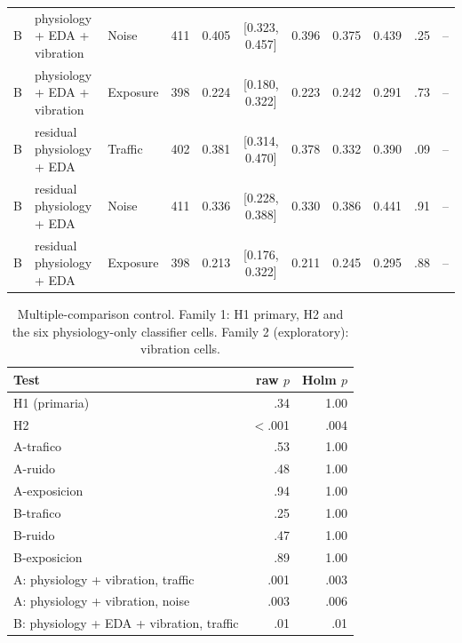 \documentclass[runningheads]{llncs}
\begin{document}
\begin{table}[h]
\begin{tabular}{@{}llllrccccrr@{}}
B & physiology + EDA + vibration & Noise & 411 & 0.405 & [0.323, 0.457] & 0.396 & 0.375 & 0.439 & .25 & --\\
B & physiology + EDA + vibration & Exposure & 398 & 0.224 & [0.180, 0.322] & 0.223 & 0.242 & 0.291 & .73 & --\\
B & residual physiology + EDA & Traffic & 402 & 0.381 & [0.314, 0.470] & 0.378 & 0.332 & 0.390 & .09 & --\\
B & residual physiology + EDA & Noise & 411 & 0.336 & [0.228, 0.388] & 0.330 & 0.386 & 0.441 & .91 & --\\
B & residual physiology + EDA & Exposure & 398 & 0.213 & [0.176, 0.322] & 0.211 & 0.245 & 0.295 & .88 & --\\
\bottomrule
\end{tabular}
\end{table}

\begin{table}[h]
\caption{Multiple-comparison control. Family 1: H1 primary, H2 and the six physiology-only classifier cells. Family 2 (exploratory): vibration cells.}
\small\centering
\begin{tabular}{@{}lrr@{}}
\toprule
Test & raw $p$ & Holm $p$\\
\midrule
H1 (primaria) & .34 & 1.00\\
H2 & $<$.001 & .004\\
A-trafico & .53 & 1.00\\
A-ruido & .48 & 1.00\\
A-exposicion & .94 & 1.00\\
B-trafico & .25 & 1.00\\
B-ruido & .47 & 1.00\\
B-exposicion & .89 & 1.00\\
\midrule
A: physiology + vibration, traffic & .001 & .003\\
A: physiology + vibration, noise & .003 & .006\\
B: physiology + EDA + vibration, traffic & .01 & .01\\
\bottomrule
\end{tabular}
\end{table}
\end{document}
